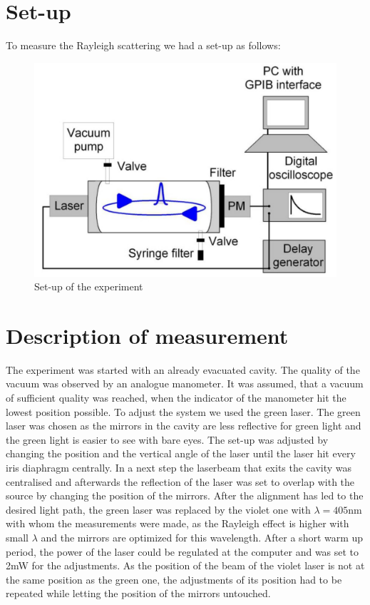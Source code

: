 \documentclass[
	parskip=half,10pt,
	numbers= noenddot, %
	toc=flat, %
	oneside,
	twocolumn,
	]{scrartcl}
\begin{document}
\section{Set-up}
To measure the Rayleigh scattering we had a set-up as follows:
\begin{figure}[h]
\includegraphics[width = .48 \textwidth]{images/aufbau.pdf}
\caption{Set-up of the experiment \citep{wiki}}
\label{fig:experiment}
\end{figure}

\section{Description of measurement}
The experiment was started with an already evacuated cavity. The quality of the vacuum was observed by an analogue manometer. It was assumed, that a vacuum of sufficient 
quality was reached, when the indicator of the manometer hit the lowest position possible. 
To adjust the system we used the green laser. The green laser was chosen as the mirrors in the cavity are less reflective for green light and the green light is easier to 
see with bare eyes. The set-up was adjusted by changing the position and the vertical angle of the laser until the laser hit every iris diaphragm centrally. In a next step 
the laserbeam that exits the cavity was centralised and afterwards the reflection of the laser was set to overlap with the source by changing the position of the mirrors. 
After the alignment has led to the desired light path, the green laser was replaced by the violet one with $\lambda=405\si{\nano \meter}$ with whom the measurements were 
made, as the Rayleigh effect is higher with small $\lambda$ and the mirrors are optimized for this wavelength. After a short warm up period, the power of the laser could be 
regulated at the computer and was set to 2mW for the adjustments. As the position of the beam of the violet laser is not at the same position as the green one, the 
adjustments of its position had to be repeated while letting the position of the mirrors untouched.
\end{document}
